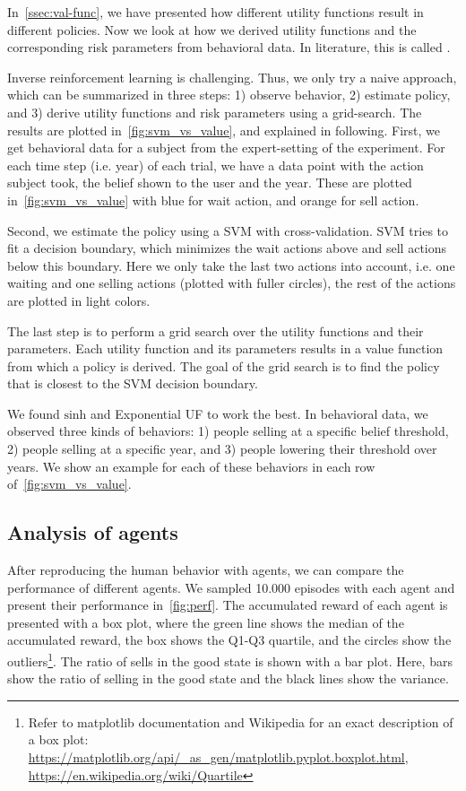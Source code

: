 In~\autoref{ssec:val-func}, we have presented how different utility functions result in different policies.
Now we look at how we derived utility functions and the corresponding risk parameters from behavioral data.
In literature, this is called  \cite{Abbeel2010}.

Inverse reinforcement learning is challenging. Thus, we only try a naive approach, which can be summarized in three steps: 1) observe behavior, 2) estimate policy, and 3) derive utility functions and risk parameters using a grid-search.
The results are plotted in~\autoref{fig:svm_vs_value}, and explained in following. 
First, we get behavioral data for a subject from the expert-setting of the experiment.
For each time step (i.e. year) of each trial, we have a data point with the action subject took, the belief shown to the user and the year. These are plotted in~\autoref{fig:svm_vs_value} with blue for wait action, and orange for sell action.

Second, we estimate the policy using a SVM \cite{svm} with cross-validation. SVM tries to fit a decision boundary, which minimizes the wait actions above and sell actions below this boundary. Here we only take the last two actions into account, i.e. one waiting and one selling actions (plotted with fuller circles), the rest of the actions are plotted in light colors.

The last step is to perform a grid search over the utility functions and their parameters.
Each utility function and its parameters results in a value function from which a policy is derived.
The goal of the grid search is to find the policy that is closest to the SVM decision boundary.

We found $\text{sinh}$ and Exponential UF to work the best. In behavioral data, we observed three kinds of behaviors: 1) people selling at a specific belief threshold, 2) people selling at a specific year, and 3) people lowering their threshold over years. We show an example for each of these behaviors in each row of~\autoref{fig:svm_vs_value}.



\subsection{Analysis of agents}
After reproducing the human behavior with agents, we can compare the performance of different agents.
We sampled 10.000 episodes with each agent and present their performance in~\autoref{fig:perf}. The accumulated reward of each agent is presented with a box plot, where the green line shows the median of the accumulated reward, the box shows the Q1-Q3 quartile, and the circles show the outliers\footnote{Refer to matplotlib documentation and Wikipedia for an exact description of a box plot: \url{https://matplotlib.org/api/_as_gen/matplotlib.pyplot.boxplot.html}, \url{https://en.wikipedia.org/wiki/Quartile}}.
The ratio of sells in the good state is shown with a bar plot.
Here, bars show the ratio of selling in the good state and the black lines show the variance.

